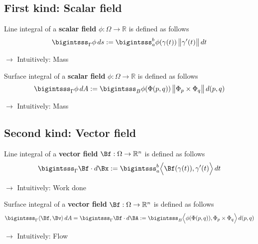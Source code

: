 \documentclass[12pt]{article}
\begin{document}
\subsection{First kind: Scalar field}
\begin{recallboxed}
	\label{recall:scalar}
	Line integral of a 
	\textbf{scalar field} $\phi: \Omega \to \mathbb{R}$ is defined as follows
	\begin{align}
		\bigintsss_{\Gamma} \phi \, ds 
		:= \bigintsss_{a}^{b} \phi(\gamma(t))  \, \big\| \gamma'(t) \big\| \, dt
	\end{align}
\end{recallboxed}
$\rightarrow$ Intuitively: Mass
\begin{recallboxed}
	\label{recall:scalarsurface}
	Surface integral of a 
	\textbf{scalar field} $\phi: \Omega \to \mathbb{R}$ is defined as follows
	\begin{align}
		\bigintsss_{\Gamma} \phi \, dA 
		:= \bigintsss_{B} \phi(\Phi(p,q)) \, \big\| \Phi_p \times \Phi_q \big\| \, d(p,q)
	\end{align}
\end{recallboxed}
$\rightarrow$ Intuitively: Mass
\subsection{Second kind: Vector field}
\begin{recallboxed}
	\label{recall:vectorsurface}
	Line integral of a \textbf{vector field} $\Bf: \Omega \to \mathbb{R}^{n}$ is defined as follows
	\begin{align}
		\bigintsss_{\Gamma} \Bf \cdot d\Bx 
		:= \bigintsss_{a}^{b}
		\Big\langle \Bf(\gamma(t)), \gamma'(t) \Big\rangle \, dt
	\end{align}
\end{recallboxed}
$\rightarrow$ Intuitively: Work done
\begin{recallboxed}
	\label{recall:vector}
	Surface integral of a \textbf{vector field} $\Bf: \Omega \to \mathbb{R}^{n}$ is defined as follows
	\begin{align}
		\bigintsss_{\Gamma} \langle \Bf, \Bv \rangle \, dA 
		= \bigintsss_{\Gamma} \Bf \cdot d\BA
		:= \bigintsss_{B}
		\Big\langle 
		\phi(\Phi(p,q)), \Phi_p \times \Phi_q
		\Big\rangle
		\, d(p,q)
	\end{align}
\end{recallboxed}
$\rightarrow$ Intuitively: Flow 
\clearpage
\end{document}
